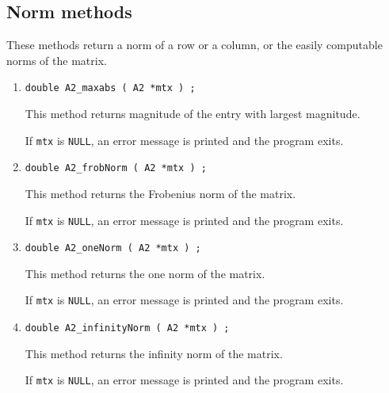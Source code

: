 \subsection{Norm methods}
\label{subsection:A2:proto:norms}
\par
These methods return a norm of a row or a column, or the easily
computable norms of the matrix.
\begin{enumerate}
\item
\begin{verbatim}
double A2_maxabs ( A2 *mtx ) ;
\end{verbatim}
This method returns magnitude of the entry with largest magnitude.
\par {}
If {\tt mtx} is {\tt NULL}, 
an error message is printed and the program exits.
\item
\begin{verbatim}
double A2_frobNorm ( A2 *mtx ) ;
\end{verbatim}
This method returns the Frobenius norm of the matrix.
\par {}
If {\tt mtx} is {\tt NULL}, 
an error message is printed and the program exits.
\item
\begin{verbatim}
double A2_oneNorm ( A2 *mtx ) ;
\end{verbatim}
This method returns the one norm of the matrix.
\par {}
If {\tt mtx} is {\tt NULL}, 
an error message is printed and the program exits.
\item
\begin{verbatim}
double A2_infinityNorm ( A2 *mtx ) ;
\end{verbatim}
This method returns the infinity norm of the matrix.
\par {}
If {\tt mtx} is {\tt NULL}, 
an error message is printed and the program exits.

\end{enumerate}
